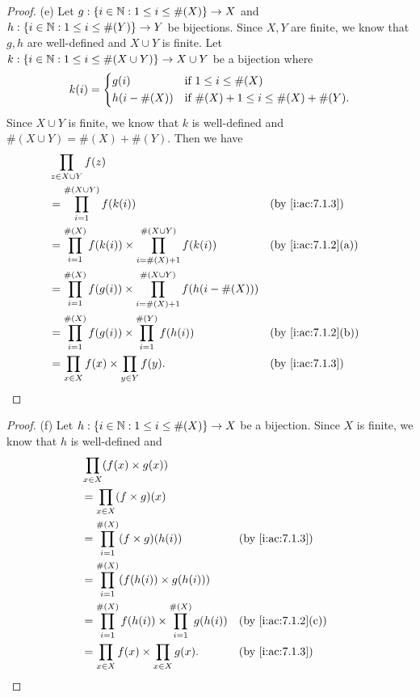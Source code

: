 \begin{proof}{(e)}
  Let \(g : \left\lbrace i \in \mathbb{N} : 1 \leq i \leq \#(X)\right\rbrace \to X\) and \(h : \left\lbrace i \in \mathbb{N} : 1 \leq i \leq \#(Y)\right\rbrace \to Y\) be bijections.
  Since \(X, Y\) are finite, we know that \(g, h\) are well-defined and \(X \cup Y\) is finite.
  Let \(k : \left\lbrace i \in \mathbb{N} : 1 \leq i \leq \#(X \cup Y)\right\rbrace \to X \cup Y\) be a bijection where
  \[
    k(i) = \begin{dcases}
      g(i)         & \text{if } 1 \leq i \leq \#(X)                  \\
      h(i - \#(X)) & \text{if } \#(X) + 1 \leq i \leq \#(X) + \#(Y).
    \end{dcases}
  \]
  Since \(X \cup Y\) is finite, we know that \(k\) is well-defined and \(\#(X \cup Y) = \#(X) + \#(Y)\).
  Then we have
  \begin{align*}
     & \prod_{z \in X \cup Y} f(z)                                                                                         \\
     & = \prod_{i = 1}^{\#(X \cup Y)} f(k(i))                                                      &  & \by{i:ac:7.1.3}    \\
     & = \prod_{i = 1}^{\#(X)} f(k(i)) \times \prod_{i = \#(X) + 1}^{\#(X \cup Y)} f(k(i))         &  & \by{i:ac:7.1.2}[a] \\
     & = \prod_{i = 1}^{\#(X)} f(g(i)) \times \prod_{i = \#(X) + 1}^{\#(X \cup Y)} f(h(i - \#(X)))                         \\
     & = \prod_{i = 1}^{\#(X)} f(g(i)) \times \prod_{i = 1}^{\#(Y)} f(h(i))                        &  & \by{i:ac:7.1.2}[b] \\
     & = \prod_{x \in X} f(x) \times \prod_{y \in Y} f(y).                                         &  & \by{i:ac:7.1.3}
  \end{align*}
\end{proof}

\begin{proof}{(f)}
  Let \(h : \left\lbrace i \in \mathbb{N} : 1 \leq i \leq \#(X)\right\rbrace \to X\) be a bijection.
  Since \(X\) is finite, we know that \(h\) is well-defined and
  \begin{align*}
     & \prod_{x \in X} (f(x) \times g(x))                                                           \\
     & = \prod_{x \in X} (f \times g)(x)                                                            \\
     & = \prod_{i = 1}^{\#(X)} (f \times g)(h(i))                           &  & \by{i:ac:7.1.3}    \\
     & = \prod_{i = 1}^{\#(X)} (f(h(i)) \times g(h(i)))                                             \\
     & = \prod_{i = 1}^{\#(X)} f(h(i)) \times \prod_{i = 1}^{\#(X)} g(h(i)) &  & \by{i:ac:7.1.2}[c] \\
     & = \prod_{x \in X} f(x) \times \prod_{x \in X} g(x).                  &  & \by{i:ac:7.1.3}
  \end{align*}
\end{proof}

